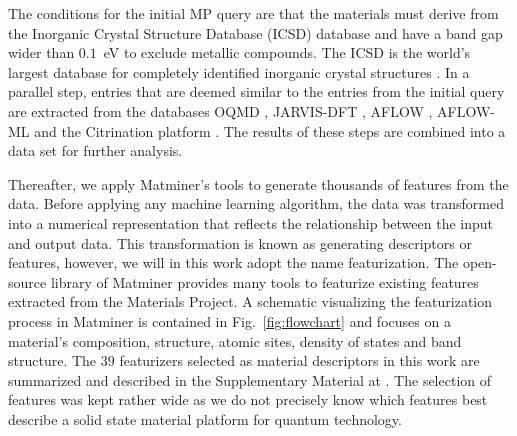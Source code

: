 \documentclass[superscriptaddress,unsortedaddress,
 amsmath,amssymb,
 aps,
]{revtex4-2}
\begin{document}
The conditions for the initial MP query are that the materials must derive from 
the Inorganic Crystal Structure Database (ICSD) database and have a band gap wider than $0.1$~eV to exclude metallic compounds. The ICSD is the world's largest database for completely identified inorganic crystal structures \cite{Allen1987,Zagorac2019}. 
In a parallel step, entries that are deemed similar to the entries from the initial query are extracted from the databases OQMD \cite{Saal2013,Kirklin2015}, JARVIS-DFT \cite{Choudhary2020}, AFLOW \cite{Curtarolo2012, Curtarolo2012a, Calderon2015}, AFLOW-ML \cite{Isayev2017} and the Citrination platform \cite{OMaraJordan2016MDIA}. The results of these steps are combined into a data set for further analysis. 

Thereafter, we apply Matminer’s \cite{Ward2018} tools to generate thousands of features from the data. 
Before applying any machine learning algorithm, the data was transformed into a numerical representation that reflects the relationship between the input and output data. This transformation is known as generating descriptors 
or features, however, we will in this work adopt the name featurization. 
The open-source library of Matminer provides many tools to featurize existing features extracted from the Materials Project. 
A schematic visualizing the featurization process in Matminer is contained in Fig.~\ref{fig:flowchart} 
and focuses on a material's composition,  structure, atomic sites, density of states and band structure. 
The $39$ featurizers selected as material descriptors in this work are summarized and described in the Supplementary Material at \cite{supplementary}. The selection of features was kept rather wide as we do not precisely know which features best describe a solid state material platform for quantum technology. 
\end{document}

